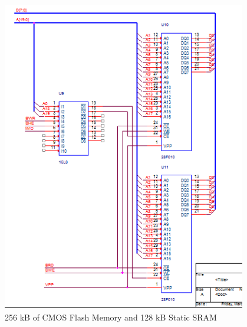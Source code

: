         \begin{figure}[ht]
            \begin{center}
                \includegraphics[width=0.95\textwidth]{figures/schematics/page3.png}
                \caption{256 kB of CMOS Flash Memory and 128 kB Static SRAM} \label{fig:page3}
            \end{center}
        \end{figure}

